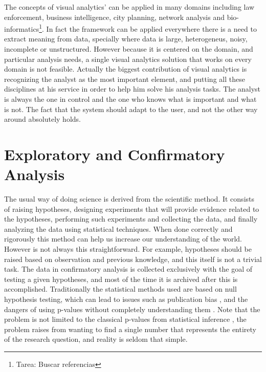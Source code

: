 The concepts of visual analytics'  can be applied in many domains including law enforcement, business intelligence, city planning, network analysis and bio-informatics\footnote{Tarea: Buscar referencias}. In fact the framework can be applied everywhere there is a need to extract meaning from data, specially where data is large, heterogeneus, noisy, incomplete or unstructured. However because it is centered on the domain, and particular analysis needs, a single visual analytics solution that works on every domain is not feasible. Actually the biggest contribution of visual analytics is recognizing the analyst as the most important element, and putting all these disciplines at his service in order to help him solve his analysis tasks. The analyst is always the one in control and the one who knows what is important and what is not. The fact that the system should adapt to the user, and not the other way around \autocite{norman_design_2002} absolutely holds.



\section{Exploratory and Confirmatory Analysis}

The usual way of doing science is derived from the scientific method. It consists of raising hypotheses, designing experiments that will provide evidence related to the hypotheses, performing such experiments and collecting the data, and finally analyzing the data using statistical techniques. When done correctly and rigorously this method can help us increase our understanding of the world. However is not always this straightforward. For example, hypotheses should be raised based on observation and previous knowledge, and this itself is not a trivial task. The data in confirmatory analysis is collected exclusively with the goal of testing a given hypotheses, and most of the time it is archived after this is accomplished. Traditionally the statistical methods used are based on null hypothesis testing, which can lead to issues such as publication bias \autocite{ioannidis_why_2005}, and the dangers of using p-values without completely understanding them \autocite{halsey_fickle_2015, nuzzo_scientific_2014, woolston_psychology_2015}. Note that the problem is not limited to the classical p-values from statistical inference \autocite{gelman_so-called_2011}, the problem raises from wanting to find a single number that represents the entirety of the research question, and reality is seldom that simple.

